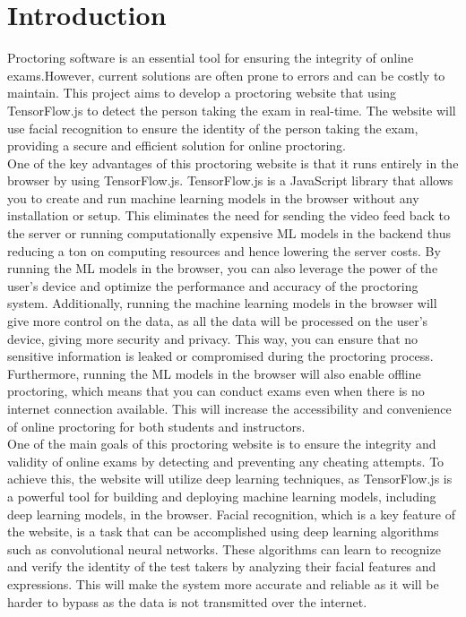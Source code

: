 \documentclass[journal]{IEEEtran}
\begin{document}
\IEEEpeerreviewmaketitle

\section{Introduction }
Proctoring software is an essential tool for ensuring the integrity of online exams.However, current solutions are often prone to errors and can be costly to maintain. This project aims to develop a proctoring website that using TensorFlow.js to detect the person taking the exam in real-time. The website will use facial recognition to ensure the identity of the person taking the exam, providing a secure and efficient solution for online proctoring.\\


One of the key advantages of this proctoring website is that it runs entirely in the browser by using TensorFlow.js. TensorFlow.js is a JavaScript library that allows you to create and run machine learning models in the browser without any installation or setup. This eliminates the need for sending the video feed back to the server or running computationally expensive ML models in the backend thus reducing a ton on computing resources and hence lowering the server costs. By running the ML models in the browser, you can also leverage the power of the user's device and optimize the performance and accuracy of the proctoring system. Additionally, running the machine learning models in the browser will give more control on the data, as all the data will be processed on the user’s device, giving more security and privacy. This way, you can ensure that no sensitive information is leaked or compromised during the proctoring process. Furthermore, running the ML models in the browser will also enable offline proctoring, which means that you can conduct exams even when there is no internet connection available. This will increase the accessibility and convenience of online proctoring for both students and instructors.\\


One of the main goals of this proctoring website is to ensure the integrity and validity of online exams by detecting and preventing any cheating attempts. To achieve this, the website will utilize deep learning techniques, as TensorFlow.js is a powerful tool for building and deploying machine learning models, including deep learning models, in the browser. Facial recognition, which is a key feature of the website, is a task that can be accomplished using deep learning algorithms such as convolutional neural networks. These algorithms can learn to recognize and verify the identity of the test takers by analyzing their facial features and expressions. This will make the system more accurate and reliable as it will be harder to bypass as the data is not transmitted over the internet. \\
\end{document}
